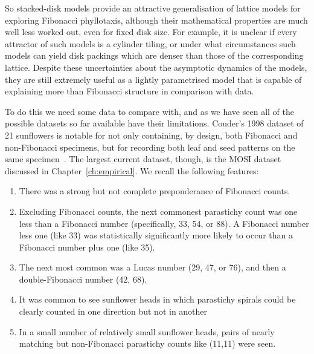 

So stacked-disk models provide an attractive generalisation of lattice models for exploring Fibonacci phyllotaxis, although their mathematical properties are much well less worked out, even for fixed disk size.  For example,  it is unclear if every attractor of such models is a cylinder tiling, or under what circumstances
such models can yield disk packings which are denser than those of the corresponding lattice. Despite these uncertainties about the asymptotic dynamics of the models, they are still extremely useful as a lightly parametrised model that is capable of explaining more than Fibonacci structure in comparison with data.

To do this we need some data to compare with, and as we have seen all of the possible datasets so far available have their limitations. Couder's 1998 dataset of 21 sunflowers is notable for not only containing, by design, both Fibonacci and non-Fibonacci specimens, but for recording both leaf and seed patterns on the same specimen~\cite{couderInitialTransitionsOrder1998}. The largest current dataset, though, is the MOSI dataset discussed in Chapter~\ref{ch:empirical}. We recall the following features:
\begin{enumerate}
	\item There was a strong but not complete preponderance of Fibonacci counts.
	\item	Excluding Fibonacci counts, the next commonest parastichy count was one less than a Fibonacci number (specifically, 33, 54, or 88).  A Fibonacci number less one (like 33) was statistically significantly more likely to occur than a Fibonacci number plus one (like 35).
	\item The next most common was a Lucas number (29, 47, or 76), and then a double-Fibonacci number (42, 68).
	\item It was common to see sunflower heads in which parastichy spirals could be clearly counted in one direction but not in another
	\item In a small number of relatively small sunflower heads, pairs of nearly matching but non-Fibonacci parastichy counts like (11,11)  were seen.
\end{enumerate}

